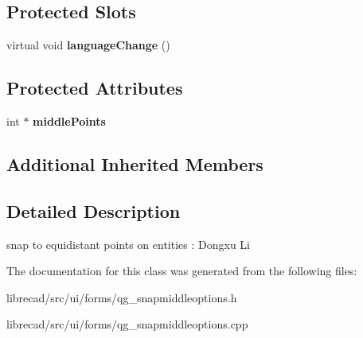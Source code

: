 \subsection*{Protected Slots}
\begin{DoxyCompactItemize}
\item 
\hypertarget{classQG__SnapMiddleOptions_aca7d6532db8c410ff675a1c190ad83e9}{virtual void {\bfseries language\-Change} ()}\label{classQG__SnapMiddleOptions_aca7d6532db8c410ff675a1c190ad83e9}

\end{DoxyCompactItemize}
\subsection*{Protected Attributes}
\begin{DoxyCompactItemize}
\item 
\hypertarget{classQG__SnapMiddleOptions_ae350e6c3e0868569bbab0bfed3a6e493}{int $\ast$ {\bfseries middle\-Points}}\label{classQG__SnapMiddleOptions_ae350e6c3e0868569bbab0bfed3a6e493}

\end{DoxyCompactItemize}
\subsection*{Additional Inherited Members}


\subsection{Detailed Description}
snap to equidistant points on entities \-: Dongxu Li 

The documentation for this class was generated from the following files\-:\begin{DoxyCompactItemize}
\item 
librecad/src/ui/forms/qg\-\_\-snapmiddleoptions.\-h\item 
librecad/src/ui/forms/qg\-\_\-snapmiddleoptions.\-cpp\end{DoxyCompactItemize}
